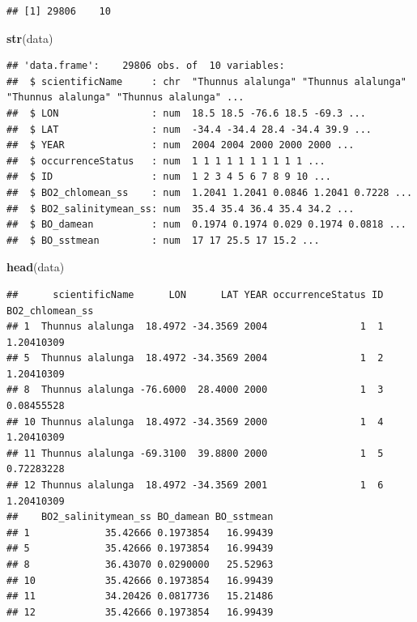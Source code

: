 \documentclass[
]{book}
\newenvironment{Shaded}{\begin{snugshade}}{\end{snugshade}}
\newcommand{\FunctionTok}[1]{\textcolor[rgb]{0.13,0.29,0.53}{\textbf{#1}}}
\newcommand{\NormalTok}[1]{#1}
\begin{document}
\begin{verbatim}
## [1] 29806    10
\end{verbatim}

\begin{Shaded}
\begin{Highlighting}[]
\FunctionTok{str}\NormalTok{(data)}
\end{Highlighting}
\end{Shaded}

\begin{verbatim}
## 'data.frame':    29806 obs. of  10 variables:
##  $ scientificName     : chr  "Thunnus alalunga" "Thunnus alalunga" "Thunnus alalunga" "Thunnus alalunga" ...
##  $ LON                : num  18.5 18.5 -76.6 18.5 -69.3 ...
##  $ LAT                : num  -34.4 -34.4 28.4 -34.4 39.9 ...
##  $ YEAR               : num  2004 2004 2000 2000 2000 ...
##  $ occurrenceStatus   : num  1 1 1 1 1 1 1 1 1 1 ...
##  $ ID                 : num  1 2 3 4 5 6 7 8 9 10 ...
##  $ BO2_chlomean_ss    : num  1.2041 1.2041 0.0846 1.2041 0.7228 ...
##  $ BO2_salinitymean_ss: num  35.4 35.4 36.4 35.4 34.2 ...
##  $ BO_damean          : num  0.1974 0.1974 0.029 0.1974 0.0818 ...
##  $ BO_sstmean         : num  17 17 25.5 17 15.2 ...
\end{verbatim}

\begin{Shaded}
\begin{Highlighting}[]
\FunctionTok{head}\NormalTok{(data)}
\end{Highlighting}
\end{Shaded}

\begin{verbatim}
##      scientificName      LON      LAT YEAR occurrenceStatus ID BO2_chlomean_ss
## 1  Thunnus alalunga  18.4972 -34.3569 2004                1  1      1.20410309
## 5  Thunnus alalunga  18.4972 -34.3569 2004                1  2      1.20410309
## 8  Thunnus alalunga -76.6000  28.4000 2000                1  3      0.08455528
## 10 Thunnus alalunga  18.4972 -34.3569 2000                1  4      1.20410309
## 11 Thunnus alalunga -69.3100  39.8800 2000                1  5      0.72283228
## 12 Thunnus alalunga  18.4972 -34.3569 2001                1  6      1.20410309
##    BO2_salinitymean_ss BO_damean BO_sstmean
## 1             35.42666 0.1973854   16.99439
## 5             35.42666 0.1973854   16.99439
## 8             36.43070 0.0290000   25.52963
## 10            35.42666 0.1973854   16.99439
## 11            34.20426 0.0817736   15.21486
## 12            35.42666 0.1973854   16.99439
\end{verbatim}
\end{document}
